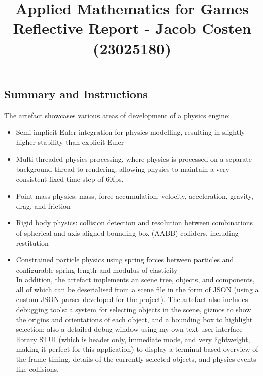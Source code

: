 \documentclass[
]{article}
\title{Applied Mathematics for Games Reflective Report - Jacob Costen
(23025180)}
\author{}
\date{}
\providecommand{\tightlist}{%
  \setlength{\itemsep}{0pt}\setlength{\parskip}{0pt}}
\begin{document}
\maketitle

\subsection{Summary and Instructions}\label{summary-and-instructions}

The artefact showcases various areas of development of a physics engine:

\begin{itemize}
\tightlist
\item
  Semi-implicit Euler integration for physics modelling, resulting in
  slightly higher stability than explicit Euler
\item
  Multi-threaded physics processing, where physics is processed on a
  separate background thread to rendering, allowing physics to maintain
  a very consistent fixed time step of 60fps.
\item
  Point mass physics: mass, force accumulation, velocity, acceleration,
  gravity, drag, and friction
\item
  Rigid body physics: collision detection and resolution between
  combinations of spherical and axis-aligned bounding box (AABB)
  colliders, including restitution
\item
  Constrained particle physics using spring forces between particles and
  configurable spring length and modulus of elasticity\\
  In addition, the artefact implements an scene tree, objects, and
  components, all of which can be deserialised from a scene file in the
  form of JSON (using a custom JSON parser developed for the project).
  The artefact also includes debugging tools: a system for selecting
  objects in the scene, gizmos to show the origins and orientations of
  each object, and a bounding box to highlight selection; also a
  detailed debug window using my own text user interface library STUI
  (which is header only, immediate mode, and very lightweight, making it
  perfect for this application) to display a terminal-based overview of
  the frame timing, details of the currently selected objects, and
  physics events like collisions.
\end{itemize}
\end{document}
